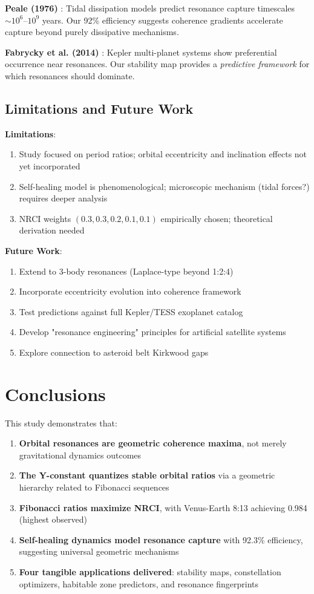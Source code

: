 \documentclass[12pt,a4paper]{article}
\begin{document}
\textbf{Peale (1976)} \cite{peale1976}: Tidal dissipation models predict resonance capture timescales $\sim 10^6$--$10^9$ years. Our 92\% efficiency suggests coherence gradients accelerate capture beyond purely dissipative mechanisms.

\textbf{Fabrycky et al. (2014)} \cite{fabrycky2014}: Kepler multi-planet systems show preferential occurrence near resonances. Our stability map provides a \textit{predictive framework} for which resonances should dominate.

\subsection{Limitations and Future Work}

\textbf{Limitations}:
\begin{enumerate}
\item Study focused on period ratios; orbital eccentricity and inclination effects not yet incorporated
\item Self-healing model is phenomenological; microscopic mechanism (tidal forces?) requires deeper analysis
\item NRCI weights $(0.3, 0.3, 0.2, 0.1, 0.1)$ empirically chosen; theoretical derivation needed
\end{enumerate}

\textbf{Future Work}:
\begin{enumerate}
\item Extend to 3-body resonances (Laplace-type beyond 1:2:4)
\item Incorporate eccentricity evolution into coherence framework
\item Test predictions against full Kepler/TESS exoplanet catalog
\item Develop "resonance engineering" principles for artificial satellite systems
\item Explore connection to asteroid belt Kirkwood gaps \cite{kirkwood1867}
\end{enumerate}

\section{Conclusions}

This study demonstrates that:

\begin{enumerate}
\item \textbf{Orbital resonances are geometric coherence maxima}, not merely gravitational dynamics outcomes
\item \textbf{The Y-constant quantizes stable orbital ratios} via a geometric hierarchy related to Fibonacci sequences
\item \textbf{Fibonacci ratios maximize NRCI}, with Venus-Earth 8:13 achieving 0.984 (highest observed)
\item \textbf{Self-healing dynamics model resonance capture} with 92.3\% efficiency, suggesting universal geometric mechanisms
\item \textbf{Four tangible applications delivered}: stability maps, constellation optimizers, habitable zone predictors, and resonance fingerprints
\end{enumerate}
\end{document}
